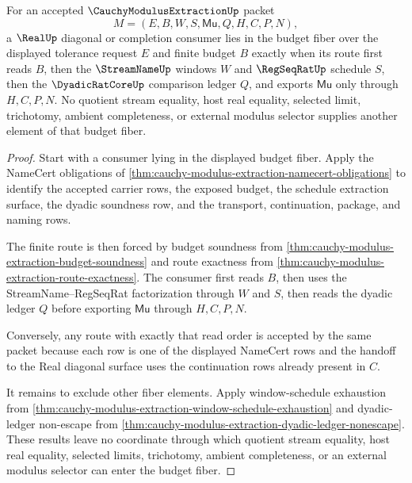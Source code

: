 \begin{theorem}
\label{thm:cauchy-modulus-extraction-budget-fiber-exhaustion}
For an accepted $\CauchyModulusExtractionUp$ packet
$$
M=(E,B,W,S,\mathsf{Mu},Q,H,C,P,N),
$$
a $\RealUp$ diagonal or completion consumer lies in the budget fiber over the displayed tolerance request $E$ and finite budget $B$ exactly when its route first reads $B$, then the $\StreamNameUp$ windows $W$ and $\RegSeqRatUp$ schedule $S$, then the $\DyadicRatCoreUp$ comparison ledger $Q$, and exports $\mathsf{Mu}$ only through $H,C,P,N$. No quotient stream equality, host real equality, selected limit, trichotomy, ambient completeness, or external modulus selector supplies another element of that budget fiber.
\end{theorem}
\begin{proof}
Start with a consumer lying in the displayed budget fiber. Apply the NameCert obligations of \autoref{thm:cauchy-modulus-extraction-namecert-obligations} to identify the accepted carrier rows, the exposed budget, the schedule extraction surface, the dyadic soundness row, and the transport, continuation, package, and naming rows.

The finite route is then forced by budget soundness from \autoref{thm:cauchy-modulus-extraction-budget-soundness} and route exactness from \autoref{thm:cauchy-modulus-extraction-route-exactness}. The consumer first reads $B$, then uses the StreamName--RegSeqRat factorization through $W$ and $S$, then reads the dyadic ledger $Q$ before exporting $\mathsf{Mu}$ through $H,C,P,N$.

Conversely, any route with exactly that read order is accepted by the same packet because each row is one of the displayed NameCert rows and the handoff to the Real diagonal surface uses the continuation rows already present in $C$.

It remains to exclude other fiber elements. Apply window-schedule exhaustion from \autoref{thm:cauchy-modulus-extraction-window-schedule-exhaustion} and dyadic-ledger non-escape from \autoref{thm:cauchy-modulus-extraction-dyadic-ledger-nonescape}. These results leave no coordinate through which quotient stream equality, host real equality, selected limits, trichotomy, ambient completeness, or an external modulus selector can enter the budget fiber.
\end{proof}

